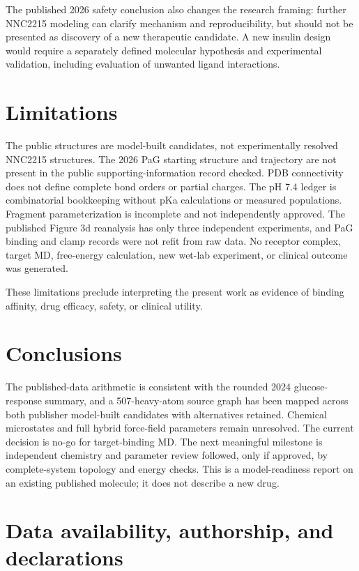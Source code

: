 \documentclass[11pt]{article}
\begin{document}
The published 2026 safety conclusion also changes the research framing: further NNC2215 modeling can clarify mechanism and reproducibility, but should not be presented as discovery of a new therapeutic candidate. A new insulin design would require a separately defined molecular hypothesis and experimental validation, including evaluation of unwanted ligand interactions.

\section{Limitations}

The public structures are model-built candidates, not experimentally resolved NNC2215 structures. The 2026 PaG starting structure and trajectory are not present in the public supporting-information record checked. PDB connectivity does not define complete bond orders or partial charges. The pH 7.4 ledger is combinatorial bookkeeping without pKa calculations or measured populations. Fragment parameterization is incomplete and not independently approved. The published Figure 3d reanalysis has only three independent experiments, and PaG binding and clamp records were not refit from raw data. No receptor complex, target MD, free-energy calculation, new wet-lab experiment, or clinical outcome was generated.

These limitations preclude interpreting the present work as evidence of binding affinity, drug efficacy, safety, or clinical utility.

\section{Conclusions}

The published-data arithmetic is consistent with the rounded 2024 glucose-response summary, and a 507-heavy-atom source graph has been mapped across both publisher model-built candidates with alternatives retained. Chemical microstates and full hybrid force-field parameters remain unresolved. The current decision is no-go for target-binding MD. The next meaningful milestone is independent chemistry and parameter review followed, only if approved, by complete-system topology and energy checks. This is a model-readiness report on an existing published molecule; it does not describe a new drug.

\section{Data availability, authorship, and declarations}
\end{document}
